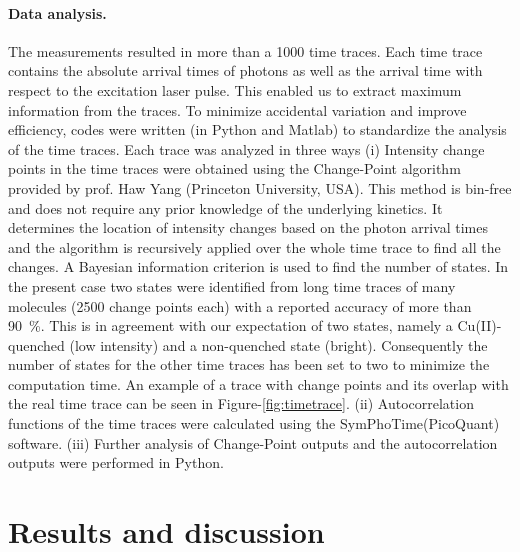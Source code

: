 \paragraph*{Data analysis.}
The measurements resulted in more than a 1000 time traces.
Each time trace contains the absolute arrival times of photons as well as the arrival time with respect to the excitation laser pulse.
This enabled us to extract maximum information from the traces.
To minimize accidental variation and improve efficiency, codes were written (in Python and Matlab) to standardize the analysis of the time traces.
Each trace was analyzed in three ways (i) Intensity change points in the time traces were obtained using the Change-Point algorithm\cite{watkins2005detection} provided by prof. Haw Yang 
(Princeton University, USA).
This method is bin-free and does not require any prior knowledge of the underlying kinetics.
It determines the location of intensity changes based on the photon arrival times and the algorithm is recursively applied over the whole time trace to find all the changes.
A Bayesian information criterion is used to find the number of states.
In the present case two states were identified from long time traces of many molecules (2500 change points each) with a reported accuracy of more than \SI{90}{\percent}.
This is in agreement with our expectation of two states, namely a Cu(II)-quenched (low intensity) and a non-quenched state (bright).
Consequently the number of states for the other time traces has been set to two to minimize the computation time.
An example of a trace with change points and its overlap with the real time trace can be seen in Figure-\ref{fig:timetrace}.
(ii) Autocorrelation functions of the time traces were calculated using the SymPhoTime(PicoQuant) software.
(iii) Further analysis of Change-Point outputs and the autocorrelation outputs were performed in Python.


\section{Results and discussion\label{sec:results}}
